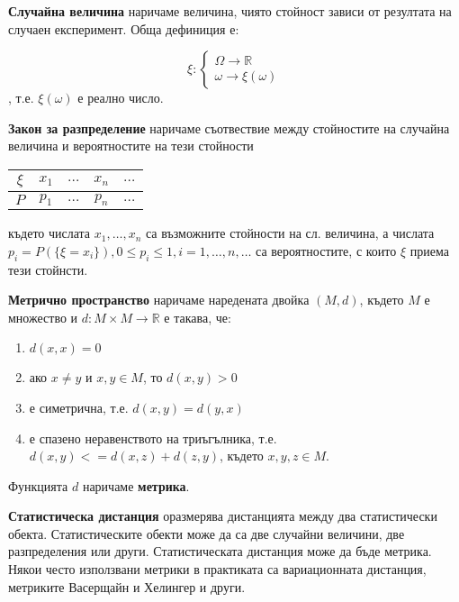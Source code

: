 \documentclass[a4paper,12pt]{article}
\begin{document}
\bigbreak

\textbf{Случайна величина} наричаме величина, чиято стойност зависи от резултата на случаен експеримент. Обща дефиниция е:

\[\xi : \begin{cases}
    \Omega \rightarrow \mathbb{R}\\
    \omega \rightarrow \xi(\omega)
\end{cases} \], т.е. $\xi(\omega)$ е реално число.

\bigbreak

\textbf{Закон за разпределение} наричаме съотвествие между стойностите на случайна величина и вероятностите на тези стойности

\begin{tabular}{|c|c|c|c|c|}
    \hline
    $\xi$ & $x_1$ & $\dots$ & $x_n$ & $\dots$ \\
    \hline
    $P$ & $p_1$ & $\dots$ & $p_n$ & $\dots$ \\
    \hline
\end{tabular}

където числата $x_1,\dots,x_n$ са възможните стойности на сл. величина, а числата 
$p_i=P(\{\xi = x_i\}), 0 \leq p_i \leq 1, i=1,\dots,n,\dots$ са вероятностите, с които $\xi$ приема тези стойнсти.

\bigbreak

\textbf{Метрично пространство} наричаме наредената двойка $(M, d)$, където $M$ е множество и $d : M \times M \to \mathbb{R}$ е такава, че:

\begin{enumerate}
    \item $d(x, x) = 0$
    \item ако $x \neq y$ и $x, y \in M$, то $d(x, y) > 0$
    \item е симетрична, т.е. $d(x, y) = d(y, x)$
    \item е спазено неравенството на триъгълника, т.е. $d(x, y) <= d(x, z) + d(z, y)$, където $x,y,z \in M$.
\end{enumerate}

Функцията $d$ наричаме \textbf{метрика}.

\bigbreak

\textbf{Статистическа дистанция} оразмерява дистанцията между два статистически обекта. Статистическите обекти може да са две случайни величини, две разпределения или други. Статистическата дистанция може да бъде метрика. Някои често използвани метрики в практиката са вариационната дистанция, метриките Васерщайн и Хелингер и други.
\end{document}
